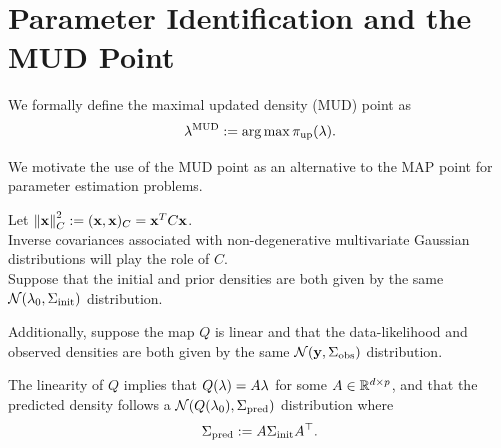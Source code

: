 \section{Parameter Identification and the MUD Point}

\begin{frame}[t]
\centering
\vskip 24pt
We formally define the maximal updated density (MUD) point as
\begin{equation}\label{eq:mudpt_inital_defn}
	\lambda^{\text{MUD}} := \operatorname*{arg\,max} {\operatorname*{\pi_{up}}}(\lambda).
\end{equation}

\vskip 24pt
We motivate the use of the MUD point as an alternative to the MAP point for parameter estimation problems.

\end{frame}

\begin{frame}[t]

Let $\left\Vert\mathbf{x}\right\Vert_C^2 := (\mathbf{x}, \mathbf{x})_C = \mathbf{x}^T C \mathbf{x}$. \\

Inverse covariances associated with non-degenerative multivariate Gaussian distributions will play the role of $C$. \\

Suppose that the initial and prior densities are both given by the same $\mathcal{N}(\lambda_0, \Sigma_\text{init})$ distribution.

\vskip 12pt
Additionally, suppose the map $Q$ is linear and that the data-likelihood and observed densities are both given by the same $\mathcal{N}(\mathbf{y}, \Sigma_\text{obs})$ distribution.

\vskip 12pt
The linearity of $Q$ implies that $Q(\lambda)=A\lambda$ for some $A\in\mathbb{R}^{d\times p}$, and that the predicted density follows a $\mathcal{N}(Q(\lambda_0), \Sigma_\text{pred})$ distribution where
\begin{equation}\label{eq:predictCov}
	\Sigma_\text{pred} := A\Sigma_\text{init} A^\top.
\end{equation}

\end{frame}

